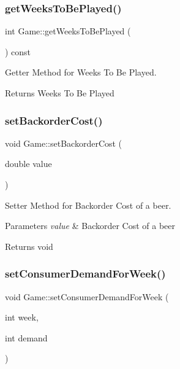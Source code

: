 \subsubsection{\texorpdfstring{get\+Weeks\+To\+Be\+Played()}{getWeeksToBePlayed()}}
{\footnotesize\ttfamily int Game\+::get\+Weeks\+To\+Be\+Played (\begin{DoxyParamCaption}{ }\end{DoxyParamCaption}) const}



Getter Method for Weeks To Be Played. 

\begin{DoxyReturn}{Returns}
Weeks To Be Played 
\end{DoxyReturn}
\mbox{\label{classGame_a41007fd1eb3df7a5f56f442267d6dff0}} 
\subsubsection{\texorpdfstring{set\+Backorder\+Cost()}{setBackorderCost()}}
{\footnotesize\ttfamily void Game\+::set\+Backorder\+Cost (\begin{DoxyParamCaption}\item[{double}]{value }\end{DoxyParamCaption})}



Setter Method for Backorder Cost of a beer. 


\begin{DoxyParams}{Parameters}
{\em value} & Backorder Cost of a beer \\
\hline
\end{DoxyParams}
\begin{DoxyReturn}{Returns}
void 
\end{DoxyReturn}
\mbox{\label{classGame_aed363630c31a7cc4674934b4af815387}} 
\subsubsection{\texorpdfstring{set\+Consumer\+Demand\+For\+Week()}{setConsumerDemandForWeek()}}
{\footnotesize\ttfamily void Game\+::set\+Consumer\+Demand\+For\+Week (\begin{DoxyParamCaption}\item[{int}]{week,  }\item[{int}]{demand }\end{DoxyParamCaption})}



